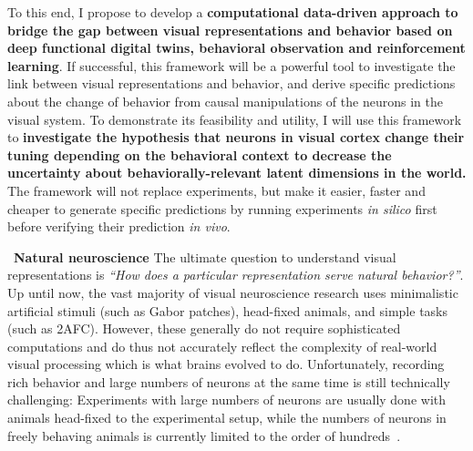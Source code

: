 \documentclass[COG,11pt]{ercgrant}
\begin{document}
To this end, I propose to develop a \textbf{computational data-driven approach to bridge the gap between visual representations and behavior based on deep functional digital twins, behavioral observation and reinforcement learning}. 
If successful, this framework will be a powerful tool to investigate the link between visual representations and behavior, and derive specific predictions about the change of behavior from causal manipulations of the neurons in the visual system.
To demonstrate its feasibility and utility, I will use this framework to \textbf{investigate the hypothesis that neurons in visual cortex change their tuning depending on the behavioral context to decrease the uncertainty about behaviorally-relevant latent dimensions in the world.} 
The framework will not replace experiments, but make it easier, faster and cheaper to generate specific predictions by running experiments \textit{in silico} first before verifying their prediction \textit{in vivo}.








~\textbf{Natural neuroscience} 
The ultimate question to understand visual representations is \textit{``How does a particular representation serve natural behavior?''}.
Up until now, the vast majority of visual neuroscience research uses minimalistic artificial stimuli (such as Gabor patches), head-fixed animals, and simple tasks (such as 2AFC).
However, these generally do not require sophisticated computations and do thus not accurately reflect the complexity of real-world visual processing which is what brains evolved to do.
Unfortunately, recording rich behavior and large numbers of neurons at the same time is still technically challenging: 
Experiments with large numbers of neurons are usually done with animals head-fixed to the experimental setup, while the numbers of neurons in freely behaving animals is currently limited to the order of hundreds~\parencite{Parker2022-ac}.
\end{document}

